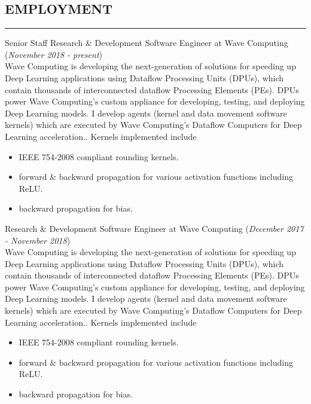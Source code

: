\documentclass[10pt,a4]{article}
\newcounter{myEnumCounter}
\newcounter{mySaveCounter}
\renewenvironment{enumerate}{%
  \begin{list}{\arabic{myEnumCounter}.}{\usecounter{myEnumCounter}%
  \setcounter{myEnumCounter}{\value{mySaveCounter}}}
  }{%
  \setcounter{mySaveCounter}{\value{myEnumCounter}}\end{list}%
}
\begin{document}
\subsection*{EMPLOYMENT}
\hrule  height 4pt
\vspace{0.2cm}
\begin{enumerate}

\item Senior Staff Research \& Development Software Engineer at Wave Computing ({\it November 2018 - present}) \\

Wave Computing is developing the next-generation of solutions for speeding up Deep Learning applications using Dataflow Processing Units (DPUs), which contain thousands of interconnected dataflow Processing Elements (PEs). DPUs power Wave Computing's custom appliance for developing, testing, and deploying Deep Learning models. I develop agents (kernel and data movement software kernels) which are executed by Wave Computing's Dataflow Computers for Deep Learning acceleration.. Kernels implemented include
\begin{itemize}
    \item IEEE 754-2008 compliant rounding kernels.
    \item forward \& backward propagation for various activation functions including ReLU.
    \item backward propagation for bias.
\end{itemize}

\item Research \& Development Software Engineer at Wave Computing ({\it December 2017 - \it November 2018}) \\

Wave Computing is developing the next-generation of solutions for speeding up Deep Learning applications using Dataflow Processing Units (DPUs), which contain thousands of interconnected dataflow Processing Elements (PEs). DPUs power Wave Computing's custom appliance for developing, testing, and deploying Deep Learning models. I develop agents (kernel and data movement software kernels) which are executed by Wave Computing's Dataflow Computers for Deep Learning acceleration.. Kernels implemented include
\begin{itemize}
    \item IEEE 754-2008 compliant rounding kernels.
    \item forward \& backward propagation for various activation functions including ReLU.
    \item backward propagation for bias.
\end{itemize}


\end{enumerate}
\end{document}
